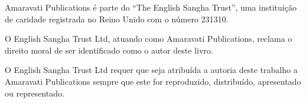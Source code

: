 {%

Amaravati Publications é parte do ``The English Sangha Trust'', uma
instituição de caridade registrada no Reino Unido com o número 231310.

O English Sangha Trust Ltd, atuando como Amaravati Publications, reclama
o direito moral de ser identiﬁcado como o autor deste livro.

O English Sangha Trust Ltd requer que seja atribuída a autoria deste
trabalho a Amaravati Publications sempre que este for reproduzido,
distribuído, apresentado ou representado.

}
